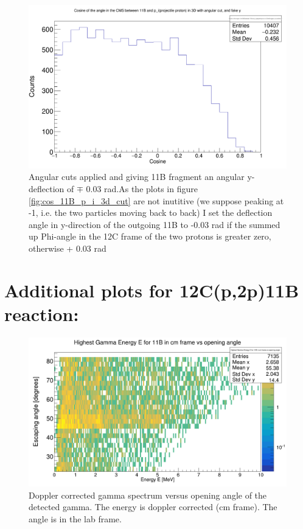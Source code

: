 \documentclass{report}
\begin{document}
\begin{figure}[hbt!]
  \includegraphics[width=\linewidth]{cos_11B_p_i_3d_cut_fake.png}
  \caption{Angular cuts applied and giving 11B fragment an angular y-deflection of $\mp$ 0.03 rad.As the plots in figure \ref{fig:cos_11B_p_i_3d_cut} are not inutitive (we suppose peaking at -1, i.e. the two particles moving back to back) I set the deflection angle in y-direction of the outgoing 11B to -0.03 rad if the summed up Phi-angle in the 12C frame of the two protons is greater zero, otherwise  + 0.03 rad}
  \label{fig:cos_11B_p_i_3d_cut_fake}
\end{figure}
\newpage

\section{Additional plots for 12C(p,2p)11B reaction:}
\begin{figure}[hbt!]
  \includegraphics[width=\linewidth]{gamma_spec_vs_opening_angle.png}
  \caption{Doppler corrected gamma spectrum versus opening angle of the detected gamma. The energy is doppler corrected (cm frame). The angle is in the lab frame.}
  \label{fig:gamma_vs_opening_angle}
\end{figure}
\end{document}
